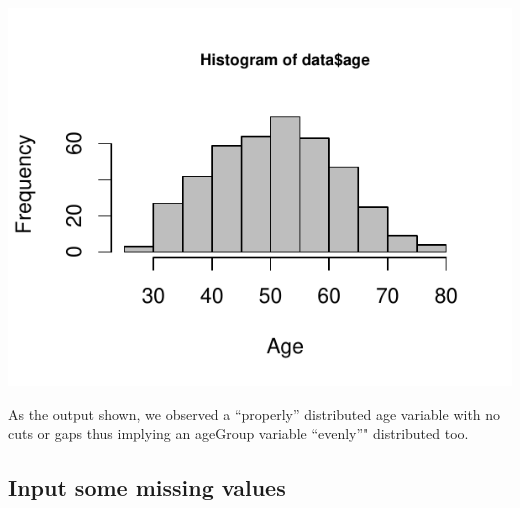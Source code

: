 \documentclass[]{article}
\newenvironment{Shaded}{\begin{snugshade}}{\end{snugshade}}
\newcommand{\KeywordTok}[1]{\textcolor[rgb]{0.13,0.29,0.53}{\textbf{#1}}}
\newcommand{\DataTypeTok}[1]{\textcolor[rgb]{0.13,0.29,0.53}{#1}}
\newcommand{\DecValTok}[1]{\textcolor[rgb]{0.00,0.00,0.81}{#1}}
\newcommand{\FloatTok}[1]{\textcolor[rgb]{0.00,0.00,0.81}{#1}}
\newcommand{\StringTok}[1]{\textcolor[rgb]{0.31,0.60,0.02}{#1}}
\newcommand{\OtherTok}[1]{\textcolor[rgb]{0.56,0.35,0.01}{#1}}
\newcommand{\OperatorTok}[1]{\textcolor[rgb]{0.81,0.36,0.00}{\textbf{#1}}}
\newcommand{\NormalTok}[1]{#1}
\begin{document}
\begin{Shaded}
\end{Shaded}

\includegraphics{survival_v5_files/figure-latex/unnamed-chunk-5-1.pdf}

As the output shown, we observed a ``properly'' distributed age variable
with no cuts or gaps thus implying an ageGroup variable ``evenly''"
distributed too.

\begin{Shaded}
\end{Shaded}

\subsection{Input some missing values}\label{input-some-missing-values}
\end{document}

